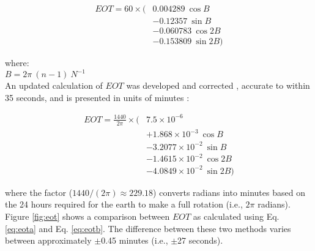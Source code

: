 \begin{equation}
\label{eq:eota}
	\begin{split}
    	EOT = 60 \times ( & 0.004289 \: \cos B \\
                         & - 0.12357 \: \sin B \\
                         & - 0.060783 \: \cos 2B \\ 
                         & - 0.153809 \: \sin 2B)
	\end{split}
\end{equation}

\noindent where: \\
\indent $B = 2\pi\: (n-1)\: N^{-1}$ \\

An updated calculation of $EOT$ was developed \parencite{spencer71} and corrected \parencite{oglesby98}, accurate to within 35 seconds, and is presented in units of minutes \parencite{iqbal83}:

\begin{equation}
\label{eq:eotb}
	\begin{split}
    	EOT = \frac{1440}{2\pi} \times ( 
    	    & 7.5 \times 10^{-6} \\ 
        	& + 1.868 \times 10^{-3} \: \cos B \\ 
            & - 3.2077 \times 10^{-2} \: \sin B \\
            & - 1.4615 \times 10^{-2} \: \cos 2B \\
            & - 4.0849 \times 10^{-2} \: \sin 2B)
	\end{split}
\end{equation}

\noindent where the factor ($1440/(2\pi) \approx 229.18$) converts radians into minutes based on the 24 hours required for the earth to make a full rotation (i.e., $2\pi$ radians). 
Figure \ref{fig:eot} shows a comparison between $EOT$ as calculated using Eq. \ref{eq:eota} and Eq. \ref{eq:eotb}. 
The difference between these two methods varies between approximately $\pm$0.45 minutes (i.e., $\pm$27 seconds).\\

